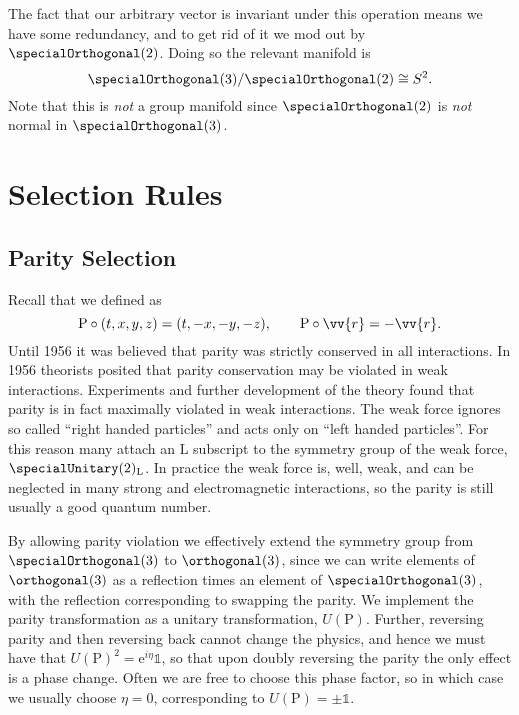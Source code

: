 \documentclass[fleqn]{NotesClass}
\newcommand*{\isomorphic}{\cong}
\newcommand*{\ident}{\mathbb{1}}
\newcommand*{\e}{\mathrm{e}}
\newcommand*{\Psym}{\mathrm{P}}
\begin{document}
    The fact that our arbitrary vector is invariant under this operation means we have some redundancy, and to get rid of it we mod out by \(\specialOrthogonal(2)\).
    Doing so the relevant manifold is
    \begin{equation}
        \specialOrthogonal(3) / \specialOrthogonal(2) \isomorphic S^2.
    \end{equation}
    Note that this is \emph{not} a group manifold since \(\specialOrthogonal(2)\) is \emph{not} normal in \(\specialOrthogonal(3)\).
    
    \chapter{Selection Rules}
    \section{Parity Selection}
    Recall that we defined  as
    \begin{equation}
        \Psym \circ (t, x, y, z) = (t, -x, -y, -z), \qquad \Psym \circ \vv{r} = -\vv{r}.
    \end{equation}
    Until 1956 it was believed that parity was strictly conserved in all interactions.
    In 1956 theorists posited that parity conservation may be violated in weak interactions.
    Experiments and further development of the theory found that parity is in fact maximally violated in weak interactions.
    The weak force ignores so called \enquote{right handed particles} and acts only on \enquote{left handed particles}.
    For this reason many attach an \(\mathrm{L}\) subscript to the symmetry group of the weak force, \(\specialUnitary(2)_{\mathrm{L}}\).
    In practice the weak force is, well, weak, and can be neglected in many strong and electromagnetic interactions, so the parity is still usually a good quantum number.
    
    By allowing parity violation we effectively extend the symmetry group from \(\specialOrthogonal(3)\) to \(\orthogonal(3)\), since we can write elements of \(\orthogonal(3)\) as a reflection times an element of \(\specialOrthogonal(3)\), with the reflection corresponding to swapping the parity.
    We implement the parity transformation as a unitary transformation, \(U(\Psym)\).
    Further, reversing parity and then reversing back cannot change the physics, and hence we must have that \(U(\Psym)^2 = \e^{i\eta}\ident\), so that upon doubly reversing the parity the only effect is a phase change.
    Often we are free to choose this phase factor, so in which case we usually choose \(\eta = 0\), corresponding to \(U(\Psym) = \pm\ident\).
    
\end{document}
